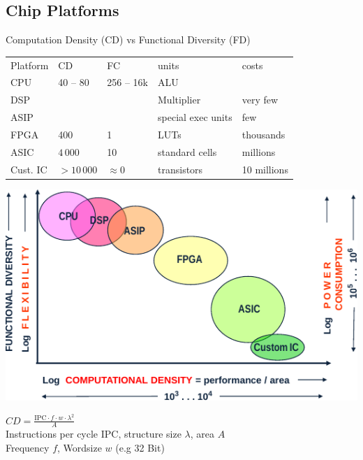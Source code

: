 \begin{sectionbox}
    \subsection{Chip Platforms}
	Computation Density (CD) vs Functional Diversity (FD)\\
	\begin{tabular}{@{}l@{\!}llll@{}}
		Platform & CD & FC & units & costs\\ \mrule
		CPU & 40 – 80 & 256 – 16k & ALU\\ 
		DSP & & & Multiplier & very few\\
		ASIP & & & special exec units & few\\
		FPGA & 400 & 1 & LUTs & thousands\\ 
		ASIC & $4\,000$ & 10 & standard cells & millions\\
		Cust. IC & $>\!10\,000$ & $\approx 0$ & transistors & 10 millions\\
	\end{tabular}
	
	\begin{center}
		\includegraphics[width = 0.9\columnwidth]{./img/chips.pdf}
	\end{center}
	$CD = \frac{\mathrm{IPC} \cdot f \cdot w \cdot \lambda^2}{A}$\\[0.5em]
	Instructions per cycle IPC, structure size $\lambda$, area $A$\\
	Frequency $f$, Wordsize $w$ (e.g 32 Bit)
\end{sectionbox}


